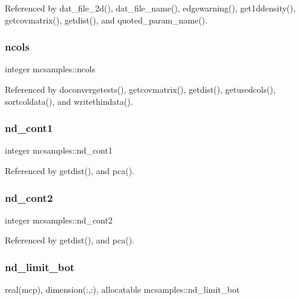 Referenced by dat\+\_\+file\+\_\+2d(), dat\+\_\+file\+\_\+name(), edgewarning(), get1ddensity(), getcovmatrix(), getdist(), and quoted\+\_\+param\+\_\+name().

\mbox{\label{namespacemcsamples_a9c7a895a8bbc32cc9ec5a4e647f93842}} 
\subsubsection{\texorpdfstring{ncols}{ncols}}
{\footnotesize\ttfamily integer mcsamples\+::ncols}



Referenced by doconvergetests(), getcovmatrix(), getdist(), getusedcols(), sortcoldata(), and writethindata().

\mbox{\label{namespacemcsamples_a76ea49efc6873b3f02d34f24ce452d5b}} 
\subsubsection{\texorpdfstring{nd\+\_\+cont1}{nd\_cont1}}
{\footnotesize\ttfamily integer mcsamples\+::nd\+\_\+cont1}



Referenced by getdist(), and pca().

\mbox{\label{namespacemcsamples_a42ec49d9a1202d3d9f840a5ae8a62420}} 
\subsubsection{\texorpdfstring{nd\+\_\+cont2}{nd\_cont2}}
{\footnotesize\ttfamily integer mcsamples\+::nd\+\_\+cont2}



Referenced by getdist(), and pca().

\mbox{\label{namespacemcsamples_af6035de97e3096d7ba8ee9ac9a2d8e1b}} 
\subsubsection{\texorpdfstring{nd\+\_\+limit\+\_\+bot}{nd\_limit\_bot}}
{\footnotesize\ttfamily real(mcp), dimension(\+:,\+:), allocatable mcsamples\+::nd\+\_\+limit\+\_\+bot}



